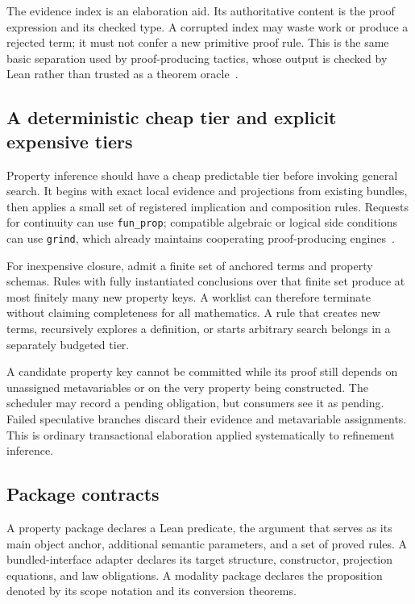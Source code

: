 \documentclass[11pt,letterpaper]{article}
\newcommand{\code}[1]{\nolinkurl{#1}}
\theoremstyle{definition}
\theoremstyle{remark}
\begin{document}
The evidence index is an elaboration aid. Its authoritative content is the proof
expression and its checked type. A corrupted index may waste work or produce a
rejected term; it must not confer a new primitive proof rule. This is the same
basic separation used by proof-producing tactics, whose output is checked by
Lean rather than trusted as a theorem oracle~\cite{LeanProofs}.

\subsection{A deterministic cheap tier and explicit expensive tiers}
Property inference should have a cheap predictable tier before invoking general
search. It begins with exact local evidence and projections from existing
bundles, then applies a small set of registered implication and composition
rules. Requests for continuity can use \code{fun_prop}; compatible algebraic or
logical side conditions can use \code{grind}, which already maintains cooperating
proof-producing engines~\cite{FunProp,Grind}.

For inexpensive closure, admit a finite set of anchored terms and property
schemas. Rules with fully instantiated conclusions over that finite set produce
at most finitely many new property keys. A worklist can therefore terminate
without claiming completeness for all mathematics. A rule that creates new
terms, recursively explores a definition, or starts arbitrary search belongs in
a separately budgeted tier.

A candidate property key cannot be committed while its proof still depends on
unassigned metavariables or on the very property being constructed. The
scheduler may record a pending obligation, but consumers see it as pending.
Failed speculative branches discard their evidence and metavariable assignments.
This is ordinary transactional elaboration applied systematically to refinement
inference.

\subsection{Package contracts}
A property package declares a Lean predicate, the argument that serves as its
main object anchor, additional semantic parameters, and a set of proved rules.
A bundled-interface adapter declares its target structure, constructor,
projection equations, and law obligations. A modality package declares the
proposition denoted by its scope notation and its conversion theorems.
\end{document}
